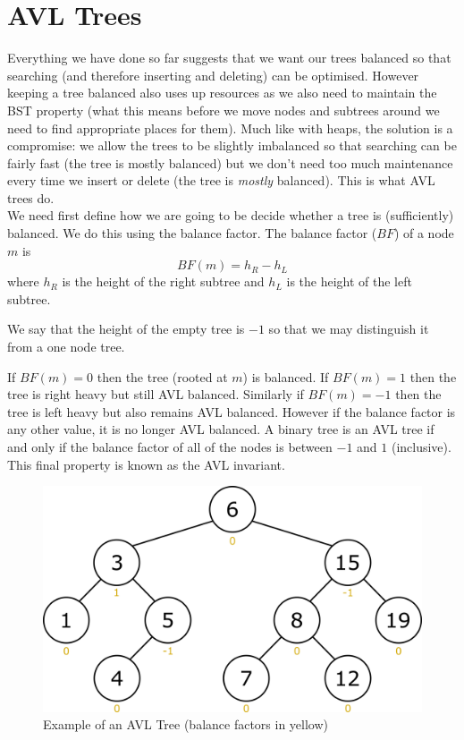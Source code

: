 \section{AVL Trees}
Everything we have done so far suggests that we want our trees balanced so that searching (and therefore inserting and deleting) can be optimised. However keeping a tree balanced also uses up resources as we also need to maintain the BST property (what this means before we move nodes and subtrees around we need to find appropriate places for them). Much like with heaps, the solution is a compromise: we allow the trees to be slightly imbalanced so that searching can be fairly fast (the tree is mostly balanced) but we don't need too much maintenance every time we insert or delete (the tree is \textit{mostly} balanced). This is what AVL trees do.\\

We need first define how we are going to be decide whether a tree is (sufficiently) balanced. We do this using the balance factor. The balance factor ($BF$) of a node $m$ is
$$BF(m) = h_R - h_L$$
where $h_R$ is the height of the right subtree and $h_L$ is the height of the left subtree.
\begin{remark}
We say that the height of the empty tree is $-1$ so that we may distinguish it from a one node tree.
\end{remark}
If $BF(m) = 0$ then the tree (rooted at $m$) is balanced. If $BF(m) = 1$ then the tree is right heavy but still AVL balanced. Similarly if $BF(m) = -1$ then the tree is left heavy but also remains AVL balanced. However if the balance factor is any other value, it is no longer AVL balanced. A binary tree is an AVL tree if and only if the balance factor of all of the nodes is between $-1$ and $1$ (inclusive). This final property is known as the AVL invariant.

\begin{figure}[h]
    \centering
    \includegraphics[scale=0.25]{Images/avl_example.png}
    \caption{Example of an AVL Tree (balance factors in yellow)}
    \label{fig:avl_example}
\end{figure}

